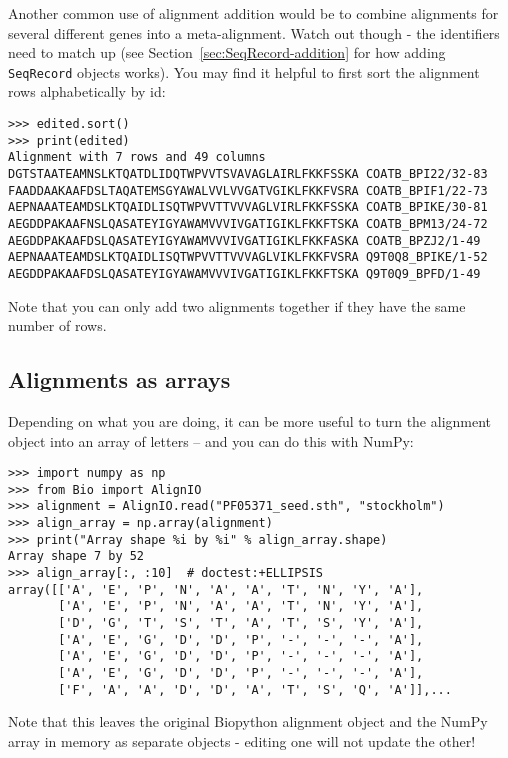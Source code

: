 Another common use of alignment addition would be to combine alignments for
several different genes into a meta-alignment. Watch out though - the identifiers
need to match up (see Section~\ref{sec:SeqRecord-addition} for how adding
\verb|SeqRecord| objects works). You may find it helpful to first sort the
alignment rows alphabetically by id:

\begin{verbatim}
>>> edited.sort()
>>> print(edited)
Alignment with 7 rows and 49 columns
DGTSTAATEAMNSLKTQATDLIDQTWPVVTSVAVAGLAIRLFKKFSSKA COATB_BPI22/32-83
FAADDAAKAAFDSLTAQATEMSGYAWALVVLVVGATVGIKLFKKFVSRA COATB_BPIF1/22-73
AEPNAAATEAMDSLKTQAIDLISQTWPVVTTVVVAGLVIRLFKKFSSKA COATB_BPIKE/30-81
AEGDDPAKAAFNSLQASATEYIGYAWAMVVVIVGATIGIKLFKKFTSKA COATB_BPM13/24-72
AEGDDPAKAAFDSLQASATEYIGYAWAMVVVIVGATIGIKLFKKFASKA COATB_BPZJ2/1-49
AEPNAAATEAMDSLKTQAIDLISQTWPVVTTVVVAGLVIKLFKKFVSRA Q9T0Q8_BPIKE/1-52
AEGDDPAKAAFDSLQASATEYIGYAWAMVVVIVGATIGIKLFKKFTSKA Q9T0Q9_BPFD/1-49
\end{verbatim}

\noindent Note that you can only add two alignments together if they
have the same number of rows.

\subsection{Alignments as arrays}
Depending on what you are doing, it can be more useful to turn the alignment
object into an array of letters -- and you can do this with NumPy:

\begin{verbatim}
>>> import numpy as np
>>> from Bio import AlignIO
>>> alignment = AlignIO.read("PF05371_seed.sth", "stockholm")
>>> align_array = np.array(alignment)
>>> print("Array shape %i by %i" % align_array.shape)
Array shape 7 by 52
>>> align_array[:, :10]  # doctest:+ELLIPSIS
array([['A', 'E', 'P', 'N', 'A', 'A', 'T', 'N', 'Y', 'A'],
       ['A', 'E', 'P', 'N', 'A', 'A', 'T', 'N', 'Y', 'A'],
       ['D', 'G', 'T', 'S', 'T', 'A', 'T', 'S', 'Y', 'A'],
       ['A', 'E', 'G', 'D', 'D', 'P', '-', '-', '-', 'A'],
       ['A', 'E', 'G', 'D', 'D', 'P', '-', '-', '-', 'A'],
       ['A', 'E', 'G', 'D', 'D', 'P', '-', '-', '-', 'A'],
       ['F', 'A', 'A', 'D', 'D', 'A', 'T', 'S', 'Q', 'A']],...
\end{verbatim}

Note that this leaves the original Biopython alignment object and the NumPy array
in memory as separate objects - editing one will not update the other!

